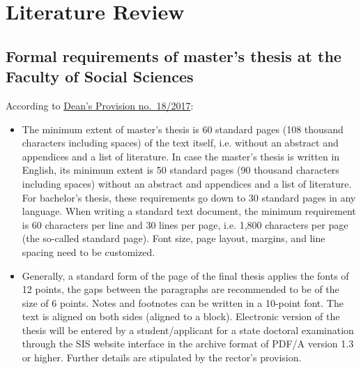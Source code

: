 \chapter{Literature Review}
\label{chap:two}


\section{Formal requirements of master's thesis at the Faculty of Social Sciences}
\label{sec:formal}

According to \href{https://www.fsv.cuni.cz/deans-provision-no-182017}{Dean's Provision no.\ 18/2017}:
\begin{itemize}
		\item  The minimum extent of master's thesis is 60 standard pages (108 thousand characters including spaces) of the text itself, i.e. without an abstract and appendices and a list of literature. In case the master's thesis is written in English, its minimum extent is 50 standard pages (90 thousand characters including spaces) without an abstract and appendices and a list of literature. For bachelor's thesis, these requirements go down to 30 standard pages in any language. When writing a standard text document, the minimum requirement is 60 characters per line and 30 lines per page, i.e. 1,800 characters per page (the so-called standard page). Font size, page layout, margins, and line spacing need to be customized.
		\item Generally, a standard form of the page of the final thesis applies the fonts of 12 points, the gaps between the paragraphs are recommended to be of the size of 6 points. Notes and footnotes can be written in a 10-point font. The text is aligned on both sides (aligned to a block). Electronic version of the thesis will be entered by a student/applicant for a state doctoral examination through the SIS website interface in the archive format of PDF/A version 1.3 or higher. Further details are stipulated by the rector's provision.
\end{itemize}





